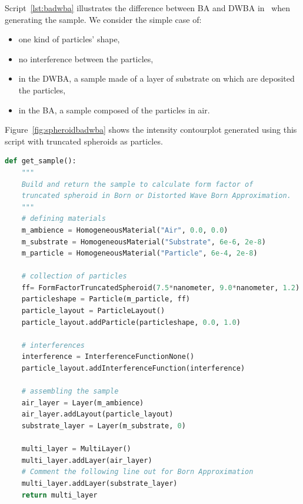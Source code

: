 Script~\ref{lst:badwba} illustrates the difference between BA and DWBA in \BornAgain\ when generating the sample.  We consider the simple case of:
\begin{itemize}
\item one kind of particles' shape,
\item no interference between the particles,
\item in the DWBA, a sample made of a layer of substrate on which are deposited the particles,
\item in the BA, a sample composed of the particles in air.
\end{itemize} 

Figure~\ref{fig:spheroidbadwba} shows the intensity contourplot generated using this script with truncated spheroids as particles.

\newpage


\begin{lstlisting}[language=python, style=eclipseboxed,numbers=none,nolol,caption={\Code{Python} script to generate a sample using Born (BA) or Distorted Wave Born Approximation (DWBA). The difference between BA and DWBA in this simple case is the absence or presence of a substrate layer in the sample.},label={lst:badwba}]
def get_sample():
    """
    Build and return the sample to calculate form factor of 
    truncated spheroid in Born or Distorted Wave Born Approximation.
    """
    # defining materials
    m_ambience = HomogeneousMaterial("Air", 0.0, 0.0)
    m_substrate = HomogeneousMaterial("Substrate", 6e-6, 2e-8)
    m_particle = HomogeneousMaterial("Particle", 6e-4, 2e-8)

    # collection of particles
    ff= FormFactorTruncatedSpheroid(7.5*nanometer, 9.0*nanometer, 1.2)
    particleshape = Particle(m_particle, ff)
    particle_layout = ParticleLayout()
    particle_layout.addParticle(particleshape, 0.0, 1.0)

    # interferences
    interference = InterferenceFunctionNone()
    particle_layout.addInterferenceFunction(interference)

    # assembling the sample
    air_layer = Layer(m_ambience)
    air_layer.addLayout(particle_layout)
    substrate_layer = Layer(m_substrate, 0)

    multi_layer = MultiLayer()
    multi_layer.addLayer(air_layer)
    # Comment the following line out for Born Approximation
    multi_layer.addLayer(substrate_layer)
    return multi_layer
\end{lstlisting}


